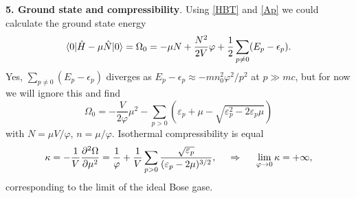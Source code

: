 \textbf{5. Ground state and compressibility}. Using \eqref{HBT} and \eqref{Ap} we could calculate the ground state energy
\begin{equation}
	\bk{0}[\hat{H} - \mu \hat{N}]{0} = \Omega_0 = - \mu N + \frac{N^2}{2V}\varphi +\frac{1}{2} \sum_{p \neq 0} (E_p - \epsilon_p).
	\label{BECgs}
\end{equation}
Yes, $\sum_{p \neq 0} (E_p - \epsilon_p)$ diverges as $E_p - \epsilon_p \approx - m n_0^2 \varphi^2 / p^2$ at $p \gg mc$, but for now we will ignore this and find 
\begin{equation*}
	\Omega_0 = - \frac{V}{2\varphi} \mu^2 - \sum_{p > 0} \left(
		\varepsilon_p + \mu - \sqrt{\varepsilon_p^2 - 2 \varepsilon_p \mu} 
	\right)
\end{equation*}
with $N = \mu V  / \varphi$, $n = \mu / \varphi$. Isothermal compressibility is equal
\begin{equation*}
	\kappa = - \frac{1}{V} \frac{\partial^2 \Omega}{\partial \mu^2} = \frac{1}{\varphi} + \frac{1}{V} \sum_{p > 0} \frac{\sqrt{\varepsilon_p}}{(\varepsilon_p -2\mu)^{3/2}},
	\hspace{0.5cm} \Rightarrow \hspace{0.5cm}
	\lim_{\varphi \to 0} \kappa = +\infty,
\end{equation*}
corresponding to the limit of the ideal Bose gase. 


